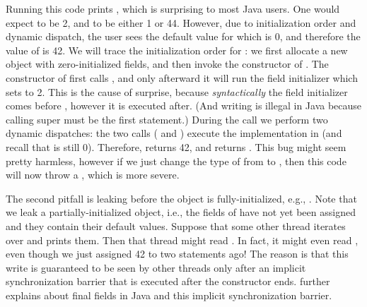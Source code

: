 Running this code prints , which is
    surprising to most Java users.
One would expect  to be 2, and  to be either 1 or 44.
However, due to initialization order and dynamic dispatch,
    the user sees the default value for  which is 0,
    and therefore the value of  is 42.
We will trace the initialization order for :
    we first allocate a new object with zero-initialized fields,
    and then invoke the constructor of .
The constructor of  first calls ,
    and only afterward it will run the field initializer which sets  to 2.
This is the cause of surprise, because \emph{syntactically} the field initializer comes before
    ,
    however it is executed after.
(And writing  is illegal in Java because
    calling super must be the first statement.)
During the  call we perform two dynamic dispatches:
    the two calls ( and )
    execute the implementation in  (and recall that  is still 0).
Therefore,  returns 42, and  returns .
This bug might seem pretty harmless,
    however if we just change the type of  from  to ,
    then this code will now throw a ,
    which is more severe.

The second pitfall is leaking \this before the object is fully-initialized,
    e.g., .
Note that we leak a partially-initialized object, i.e.,
    the fields of  have not yet been assigned and they contain their default values.
Suppose that some other thread iterates over  and prints them.
Then that thread might read .
In fact, it might even read , even though we just assigned 42 to  two statements ago!
The reason is that this write is guaranteed to be seen by other threads only
    after an implicit synchronization barrier that is executed after the constructor ends.
 further explains about final fields in Java and this implicit synchronization barrier.



